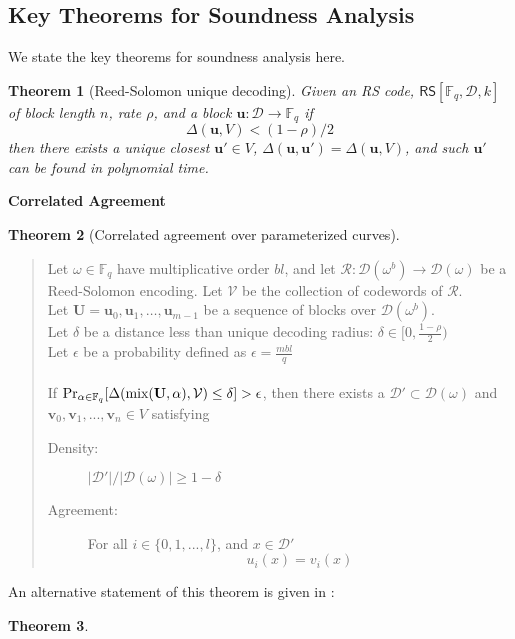 \documentclass[10pt,letterpaper,titlepage]{article}
\newcommand{\GF}[1]{\mathbb{F}_{#1}}
\newcommand{\w}[0]{\omega}
\newcommand{\p}[0]{\rho}
\newcommand{\D}[0]{\mathcal{D}}
\newtheorem{theorem}{Theorem}
\theoremstyle{definition}
\begin{document}
\begin{appendices}
\section{Key Theorems for Soundness Analysis}
\label{soundness theorems}
We state the key theorems for soundness analysis here.
\\
\begin{theorem}[Reed-Solomon unique decoding]
  \label{uniq-decode}
  Given an RS code, $\mathsf{RS}[\GF{q}, \D, k]$ of block length $n$, rate $\p$, and a block $\mathbf{u} : \D \rightarrow \GF{q}$ if
  \[
    \Delta(\mathbf{u}, V) < (1 - \p)/2
  \]
  then there exists a unique closest $\mathbf{u'} \in V$, $\Delta(\mathbf{u}, \mathbf{u'}) = \Delta(\mathbf{u}, V)$, and such $\mathbf{u'}$ can be found in polynomial time.
\end{theorem}
\noindent
\textbf{Correlated Agreement}
\begin{theorem}[Correlated agreement over parameterized curves]
  \label{delta-close}
  \end{theorem}
  \begin{quote} Let $\w\in\GF{q}$ have multiplicative order $bl$, and let $\mathcal{R}:\D(\w^b)\to\D(\w)$ be a Reed-Solomon encoding. Let $\mathcal{V}$ be the collection of codewords of $\mathcal{R}$. \\
    Let $\mathbf{U}=\mathbf{u}_0,\mathbf{u}_1,\ldots,\mathbf{u}_{m-1}$ be a sequence of blocks over $\D(\w^b)$.\\
   Let $\delta$ be a distance less than unique decoding radius: $\delta \in [0, \frac{1 - \p}{2})$\\
    Let $\epsilon$ be a probability defined as
            $\epsilon = \frac{m bl}{q}$\\
            \\
    If $\Pr_{\alpha \in \GF{q}} [\Delta(\textrm{mix}(\bold{U},\alpha), \mathcal{V}) \le \delta] > \epsilon $,
    then there exists a $\D' \subset \D(\w)$ and $\mathbf{v}_0, \mathbf{v}_1, ..., \mathbf{v}_n \in V$ satisfying
    \begin{description}
      \item[Density:] $|\D'|/|\D(\w)| \ge 1 - \delta$
      \item[Agreement:] For all $i \in \{0, 1, ..., l\}$, and $x \in \D'$ \[
          u_i(x) = v_i(x)
        \]
    \end{description}
  \end{quote}
An alternative statement of this theorem is given in \cite{FRIsummary}:
\begin{theorem}

\end{theorem}
\end{appendices}
\end{document}
